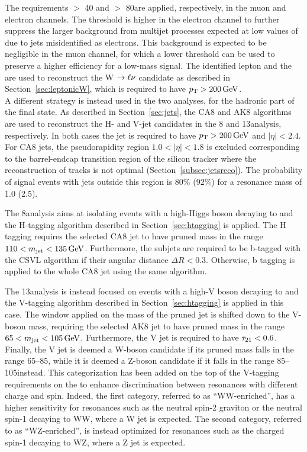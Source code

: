 The requirements \ETmiss $>$ 40 and $>$ 80\GeV are applied, respectively, in the muon and electron channels.
The threshold is higher in the electron channel to further suppress the larger background from multijet processes expected at low values of \ETmiss due to jets misidentified as electrons.
This background is expected to be negligible in the muon channel, for which a lower \ETmiss threshold can be used to preserve a higher efficiency for a low-mass signal.
The identified lepton and the \ETmiss are used to reconstruct the W $\rightarrow\ell\nu$ candidate as described in Section~\ref{sec:leptonicW},
which is required to have $p_{\mathrm{T}} > 200\,\text{Ge\hspace{-.08em}V}$.\\

A different strategy is instead used in the two analyses, for the hadronic part of the final state.
As described in Section~\ref{sec:jets}, the CA8 and AK8 algorithms are used to reconstruct the H- and V-jet candidates in the 8 and 13\TeV analysis, respectively.
In both cases the jet is required to have $p_{\mathrm{T}} > 200\,\text{Ge\hspace{-.08em}V}$ and $|\eta| < 2.4$. %
For CA8 jets, the pseudorapidity region $1.0 < |\eta| < 1.8$ is excluded corresponding to the barrel-endcap transition region of the silicon tracker where the reconstruction of tracks is not optimal (Section~\ref{subsec:jetsreco}).
The probability of signal events with jets outside this region is 80\% (92\%) for a resonance mass of 1.0 (2.5)\TeV.

The 8\TeV analysis aims at isolating events with a high-\pt Higgs boson decaying to \bbbar and the H-tagging algorithm described in Section~\ref{sec:htagging} is applied.
The H tagging requires the selected CA8 jet to have pruned mass in the range $110 < m_{\text{jet}} < 135\,\text{Ge\hspace{-.08em}V}$. Furthermore, the subjets are required to be b-tagged with the CSVL algorithm if their angular distance $\Delta R < 0.3$.
Otherwise, b tagging is applied to the whole CA8 jet using the same algorithm.

The 13\TeV analysis is instead focused on events with a high-\pt V boson decaying to \qqbar and the V-tagging algorithm described in Section~\ref{sec:htagging} is applied in this case.
The window applied on the mass of the pruned jet is shifted down to the V-boson mass, requiring the selected AK8 jet to have pruned mass in the range $65 < m_{\text{jet}} < 105\,\text{Ge\hspace{-.08em}V}$.
Furthermore, the V jet is required to have $\tau_{21} < 0.6$.
Finally, the V jet is deemed a W-boson candidate if its pruned mass falls in the range 65--85\GeV, while it is deemed a Z-boson candidate if it falls in the range 85--105\GeV instead.
This categorization has been added on the top of the V-tagging requirements on the \mJ to enhance discrimination between resonances with different charge and spin. 
Indeed, the first category, referred to as  ``WW-enriched'', has a higher sensitivity for resonances such as the neutral spin-2 graviton or the neutral spin-1 \Zpr decaying to WW, where a W jet is expected.
The second category, referred to as ``WZ-enriched'', is instead optimized for resonances such as the charged spin-1 \Wpr decaying to WZ, where a Z jet is expected.\\

